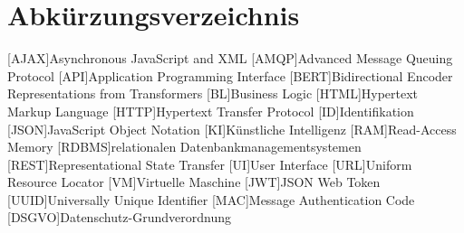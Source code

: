 \section{Abkürzungsverzeichnis}
\begin{acronym}
	[AJAX]{Asynchronous JavaScript and XML}
	[AMQP]{Advanced Message Queuing Protocol}
	[API]{Application Programming Interface}
	[BERT]{Bidirectional Encoder Representations from Transformers}
	[BL]{Business Logic}
	[HTML]{Hypertext Markup Language}
	[HTTP]{Hypertext Transfer Protocol}
	[ID]{Identifikation}
	[JSON]{JavaScript Object Notation}
	[KI]{Künstliche Intelligenz}
	[RAM]{Read-Access Memory}
	[RDBMS]{relationalen Datenbankmanagementsystemen}
	[REST]{Representational State Transfer}
	[UI]{User Interface}
	[URL]{Uniform Resource Locator}
	[VM]{Virtuelle Maschine}
	[JWT]{JSON Web Token}
	[UUID]{Universally Unique Identifier}
	[MAC]{Message Authentication Code}
	[DSGVO]{Datenschutz-Grundverordnung}
\end{acronym}
